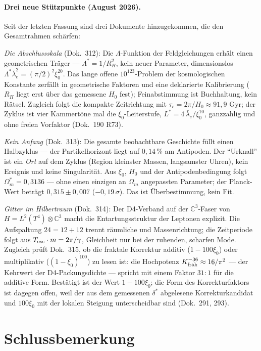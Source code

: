 \paragraph{Drei neue Stützpunkte (August 2026).}
Seit der letzten Fassung sind drei Dokumente hinzugekommen, die den
Gesamtrahmen schärfen:

\emph{Die Abschlussskala} (Dok.~312): Die $\Lambda$-Funktion der
Feldgleichungen erhält einen geometrischen Träger --- $\Lambda^* = 1/R_H^2$,
kein neuer Parameter, dimensionslos $\Lambda^*\bar\lambda_e^2 = (\pi/2)^2\xi_0^{20}$.
Das lange offene $10^{123}$-Problem der kosmologischen Konstante zerfällt
in geometrische Faktoren und eine deklarierte Kalibrierung ($R_H$ liegt
erst über das gemessene $H_0$ fest); Feinabstimmung ist Buchhaltung,
kein Rätsel. Zugleich folgt die kompakte Zeitrichtung mit
$\tau_c = 2\pi/H_0 \approx 91{,}9$ Gyr; der Zyklus ist
vier Kammertöne mal die $\xi_0$-Leiterstufe, $L^* = 4\,\bar\lambda_e/\xi_0^{10}$,
ganzzahlig und ohne freien Vorfaktor (Dok.~190 R73).

\emph{Kein Anfang} (Dok.~313): Die gesamte beobachtbare Geschichte
füllt einen Halbzyklus --- der Partikelhorizont liegt auf $0{,}14\,\%$
am Antipoden. Der \enquote{Urknall} ist ein \emph{Ort} auf dem Zyklus
(Region kleinster Massen, langsamster Uhren), kein Ereignis und keine
Singularität. Aus $\xi_0$, $H_0$ und der Antipodenbedingung folgt
$\Omega_m^* = 0{,}3136$ --- ohne einen einzigen an $\Omega_m$
angepassten Parameter; der Planck-Wert beträgt $0{,}315 \pm 0{,}007$
($-0{,}19\,\sigma$). Das ist Überbestimmung, kein Fit.

\emph{Gitter im Hilbertraum} (Dok.~314): Der D4-Verband auf der $\mathbb{C}^3$-Faser
von $H = L^2(T^4) \otimes \mathbb{C}^3$ macht die Entartungsstruktur
der Leptonen explizit. Die Aufspaltung $24 = 12 + 12$ trennt räumliche
und Massenrichtung; die Zeitperiode folgt aus $T_{\rm osc}\cdot m = 2\pi/\gamma$,
Gleichheit nur bei der ruhenden, scharfen Mode.
Zugleich prüft Dok.~315, ob die fraktale Korrektur additiv
($1-100\xi_0$) oder multiplikativ ($(1-\xi_0)^{100}$) zu lesen ist:
die Hochpotenz $K_{\rm frak}^{-36} \approx 16/\pi^2$ --- der
Kehrwert der D4-Packungsdichte --- spricht mit einem Faktor $31:1$
für die additive Form. Bestätigt ist der Wert $1-100\xi_0$; die Form
des Korrekturfaktors ist dagegen offen, weil der aus dem gemessenen
$\delta^*$ abgelesene Korrekturkandidat und $100\xi_0$ mit der lokalen
Steigung unterscheidbar sind (Dok.~291, 293).

\section{Schlussbemerkung}

